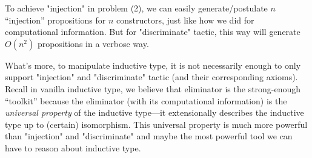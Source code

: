 








To achieve "injection" in problem (2), we can easily generate/postulate $n$ ``injection'' propositions for $n$ constructors, just like how we did for computational information. But for "discriminate" tactic, this way will generate $O(n^2)$ propositions in a verbose way. 

What's more, to manipulate inductive type, it is not necessarily enough to only support "injection" and "discriminate" tactic (and their corresponding axioms). Recall in vanilla inductive type, we believe that eliminator is the strong-enough ``toolkit'' because the eliminator (with its computational information) is the \textit{universal property} of the inductive type---it extensionally describes the inductive type up to (certain) isomorphism. This universal property is much more powerful than "injection" and "discriminate" and maybe the most powerful tool we can have to reason about inductive type. 


